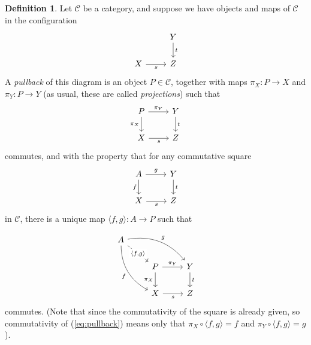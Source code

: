 \documentclass[10pt,oneside]{book}
\def\~#1{\mathscr{#1}}
\theoremstyle{plain}
\theoremstyle{definition}
\newtheorem{defn}[thm]{Definition}
\theoremstyle{remark}
\numberwithin{equation}{section}
\numberwithin{figure}{section}
\begin{document}
\begin{defn}
    Let $\~C$ be a category, and suppose we have objects and maps of $\~C$ in the configuration
    \begin{equation}
    \label{eq:setup_pullback}
        \begin{tikzcd}
                & Y \\
                X & Z
                \arrow["s"', from=2-1, to=2-2]
                \arrow["t", from=1-2, to=2-2]
        \end{tikzcd}
    \end{equation}
    A \emph{pullback} of this diagram is an object $P \in \~C$, together with maps $\pi_X: P \to X$ and $\pi_Y: P \to Y$ (as usual, these are called \emph{projections}) such that
    \begin{equation}
    \label{eq:pullbacksquare}
        \begin{tikzcd}
                P & Y \\
                X & Z
                \arrow["t", from=1-2, to=2-2]
                \arrow["{\pi_X}"', from=1-1, to=2-1]
                \arrow["s"', from=2-1, to=2-2]
                \arrow["{\pi_Y}", from=1-1, to=1-2]
        \end{tikzcd}
    \end{equation} 
    commutes, and with the property that for any commutative square
    \[
        \begin{tikzcd}
                A & Y \\
                X & Z
                \arrow["{g}", from=1-1, to=1-2]
                \arrow["s"', from=2-1, to=2-2]
                \arrow["t", from=1-2, to=2-2]
                \arrow["{f}"', from=1-1, to=2-1]
        \end{tikzcd}
    \]
    in $\~C$, there is a unique map $\langle f, g \rangle: A \to P$ such that 

\begin{equation}
\label{eq:pullback}
    \begin{tikzcd}
            A \\
            & P & Y \\
            & X & Z
            \arrow["{\langle f, g \rangle}"{description}, dashed, from=1-1, to=2-2]
            \arrow["{\pi_X}", from=2-2, to=3-2, swap]
            \arrow["{\pi_Y}", from=2-2, to=2-3]
            \arrow["s"', from=3-2, to=3-3]
            \arrow["t", from=2-3, to=3-3]
            \arrow["{f}"', bend right, from=1-1, to=3-2]
            \arrow["{g}", bend left, from=1-1, to=2-3]
    \end{tikzcd}
\end{equation}
    commutes. (Note that since the commutativity of the square is already given, so commutativity of (\ref{eq:pullback}) means only that $\pi_X \circ \langle f, g \rangle = f$ and $\pi_Y \circ \langle f, g \rangle = g$). 
\end{defn}
\end{document}
